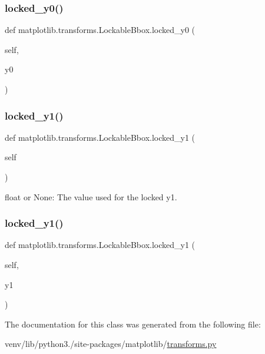 \subsubsection{\texorpdfstring{locked\+\_\+y0()}{locked\_y0()}\hspace{0.1cm}{\footnotesize\ttfamily [2/2]}}
{\footnotesize\ttfamily def matplotlib.\+transforms.\+Lockable\+Bbox.\+locked\+\_\+y0 (\begin{DoxyParamCaption}\item[{}]{self,  }\item[{}]{y0 }\end{DoxyParamCaption})}

\mbox{\label{classmatplotlib_1_1transforms_1_1LockableBbox_a9bae3dcce6572e168bb9adc1d7fdc491}} 
\subsubsection{\texorpdfstring{locked\+\_\+y1()}{locked\_y1()}\hspace{0.1cm}{\footnotesize\ttfamily [1/2]}}
{\footnotesize\ttfamily def matplotlib.\+transforms.\+Lockable\+Bbox.\+locked\+\_\+y1 (\begin{DoxyParamCaption}\item[{}]{self }\end{DoxyParamCaption})}

\begin{DoxyVerb}float or None: The value used for the locked y1.
\end{DoxyVerb}
 \mbox{\label{classmatplotlib_1_1transforms_1_1LockableBbox_ae044e8fb29e00c3d1b4b959aa57f5a70}} 
\subsubsection{\texorpdfstring{locked\+\_\+y1()}{locked\_y1()}\hspace{0.1cm}{\footnotesize\ttfamily [2/2]}}
{\footnotesize\ttfamily def matplotlib.\+transforms.\+Lockable\+Bbox.\+locked\+\_\+y1 (\begin{DoxyParamCaption}\item[{}]{self,  }\item[{}]{y1 }\end{DoxyParamCaption})}



The documentation for this class was generated from the following file\+:\begin{DoxyCompactItemize}
\item 
venv/lib/python3./site-\/packages/matplotlib/\hyperlink{transforms_8py}{transforms.\+py}\end{DoxyCompactItemize}
